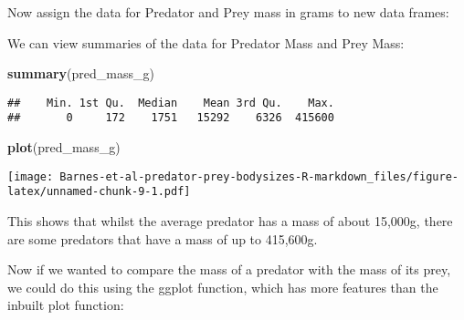 \documentclass[
]{article}
\newenvironment{Shaded}{\begin{snugshade}}{\end{snugshade}}
\newcommand{\CommentTok}[1]{\textcolor[rgb]{0.56,0.35,0.01}{\textit{#1}}}
\newcommand{\DataTypeTok}[1]{\textcolor[rgb]{0.13,0.29,0.53}{#1}}
\newcommand{\KeywordTok}[1]{\textcolor[rgb]{0.13,0.29,0.53}{\textbf{#1}}}
\newcommand{\NormalTok}[1]{#1}
\newcommand{\OperatorTok}[1]{\textcolor[rgb]{0.81,0.36,0.00}{\textbf{#1}}}
\newcommand{\StringTok}[1]{\textcolor[rgb]{0.31,0.60,0.02}{#1}}
\begin{document}
Now assign the data for Predator and Prey mass in grams to new data
frames:

\begin{Shaded}
\end{Shaded}

We can view summaries of the data for Predator Mass and Prey Mass:

\begin{Shaded}
\begin{Highlighting}[]
\KeywordTok{summary}\NormalTok{(pred_mass_g)}
\end{Highlighting}
\end{Shaded}

\begin{verbatim}
##    Min. 1st Qu.  Median    Mean 3rd Qu.    Max. 
##       0     172    1751   15292    6326  415600
\end{verbatim}

\begin{Shaded}
\begin{Highlighting}[]
\KeywordTok{plot}\NormalTok{(pred_mass_g)}
\end{Highlighting}
\end{Shaded}

\texttt{[image: Barnes-et-al-predator-prey-bodysizes-R-markdown\_files/figure-latex/unnamed-chunk-9-1.pdf]}

This shows that whilst the average predator has a mass of about 15,000g,
there are some predators that have a mass of up to 415,600g.

Now if we wanted to compare the mass of a predator with the mass of its
prey, we could do this using the ggplot function, which has more
features than the inbuilt plot function:

\begin{Shaded}
\end{Shaded}
\end{document}
